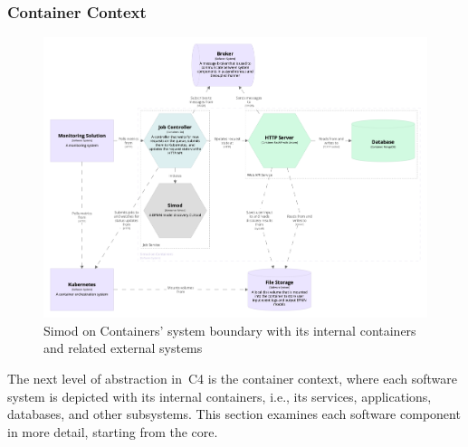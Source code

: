 \documentclass[12pt]{article}
\begin{document}
\subsubsection{Container Context}

\begin{figure}
    \centering
    \includegraphics[width=\textwidth]{figures/structurizr-1-SimodOnContainersContainer.png}
    \caption{Simod on Containers' system boundary with its internal containers and related external systems}
    \label{fig:soc_system}
\end{figure}

The next level of abstraction in~C4 is the container context, where each software system is depicted with its internal containers, i.e., its services, applications, databases, and other subsystems. This section examines each software component in more detail, starting from the core.
\end{document}
